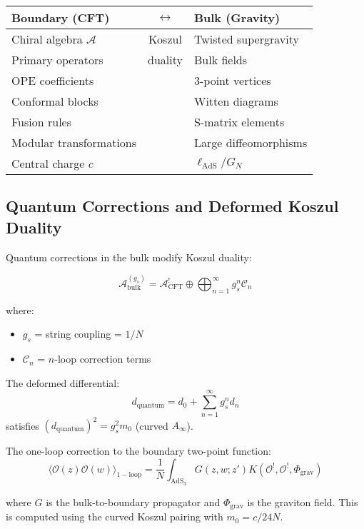 \begin{corollary}
\begin{center}
\begin{tabular}{|l|c|l|}
\hline
\textbf{Boundary (CFT)} & $\leftrightarrow$ & \textbf{Bulk (Gravity)} \\
\hline
Chiral algebra $\mathcal{A}$ & Koszul & Twisted supergravity \\
Primary operators & duality & Bulk fields \\
OPE coefficients & & 3-point vertices \\
Conformal blocks & & Witten diagrams \\
Fusion rules & & S-matrix elements \\
Modular transformations & & Large diffeomorphisms \\
Central charge $c$ & & $\ell_{\text{AdS}}/G_N$ \\
\hline
\end{tabular}
\end{center}
\end{corollary}

\subsection{Quantum Corrections and Deformed Koszul Duality}

\begin{theorem}
Quantum corrections in the bulk modify Koszul duality:

$$\mathcal{A}_{\text{bulk}}^{(g_s)} = \mathcal{A}_{\text{CFT}}^! \oplus \bigoplus_{n=1}^\infty g_s^n \mathcal{C}_n$$

where:
\begin{itemize}
\item $g_s$ = string coupling = $1/N$
\item $\mathcal{C}_n$ = $n$-loop correction terms
\end{itemize}

The deformed differential:
$$d_{\text{quantum}} = d_0 + \sum_{n=1}^\infty g_s^n d_n$$
satisfies $(d_{\text{quantum}})^2 = g_s^2 m_0$ (curved $A_\infty$).
\end{theorem}

\begin{example}
The one-loop correction to the boundary two-point function:
$$\langle \mathcal{O}(z) \mathcal{O}(w) \rangle_{1-\text{loop}} = \frac{1}{N} \int_{\text{AdS}_3} G(z,w;z') K(\mathcal{O}^!, \mathcal{O}^!, \Phi_{\text{grav}})$$

where $G$ is the bulk-to-boundary propagator and $\Phi_{\text{grav}}$ is the graviton field.
This is computed using the curved Koszul pairing with $m_0 = c/24N$.
\end{example}

